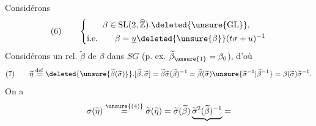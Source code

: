 Considérons
\[
(6)\qquad
\left\{\begin{gathered}
\beta\in\mathrm{SL}(2,\widehat{\mathbb Z}).\deleted{\unsure{\mathrm{GL}}},
\\
\text{i.e.}\qquad
\beta=\underline u\deleted{\unsure{\beta}}(t\sigma+u)^{-1}
\end{gathered}\right.
\]
Considérons un rel. $\widetilde\beta$ de $\beta$ dans $SG$
(p. ex. $\widetilde\beta_{\unsure{1}}=\beta_0$), d'où
\[
(7)\qquad
\widetilde\eta\overset{\mathrm{def}}=
\deleted{\unsure{\widetilde\beta(\widetilde\sigma)}}.
[\widetilde\beta,\widetilde\sigma]
=\widetilde\beta\widetilde\sigma(\widetilde\beta)^{-1}
=\widetilde\beta(\widetilde\sigma)
 \unsure{\widetilde\sigma^{-1}|\widetilde\beta^{-1}}
=\beta(\widetilde\sigma)\widetilde\sigma^{-1}.
\]
On a
\[
\sigma(\widetilde\eta)\overset{\unsure{(4)}}=
\widetilde\sigma(\widetilde\eta)
=\widetilde\sigma(\widetilde\beta)
 \underbrace{\widetilde\sigma^2(\widetilde\beta)^{-1}}=
\]
